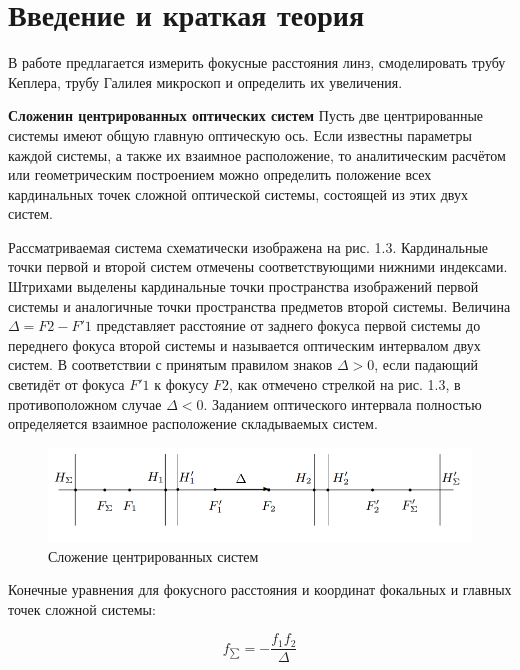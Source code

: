 \section{Введение и краткая теория}

    В работе предлагается измерить фокусные расстояния линз, смоделировать трубу Кеплера, трубу Галилея
    микроскоп и определить их увеличения.
    \newline

    \textbf{Сложенин центрированных оптических систем}
    Пусть две центрированные системы имеют общую главную оптическую ось. Если известны параметры каждой системы, а также их взаимное расположение, то аналитическим расчётом или геометрическим
    построением можно определить положение всех кардинальных точек
    сложной оптической системы, состоящей из этих двух систем.

    Рассматриваемая система схематически изображена на рис. 1.3.
    Кардинальные точки первой и второй систем отмечены соответствующими нижними индексами. Штрихами выделены кардинальные точки
    пространства изображений первой системы и аналогичные точки пространства предметов второй системы. 
    Величина $\Delta = F2 - F'1$ представляет расстояние от заднего фокуса первой системы до переднего фокуса
    второй системы и называется оптическим интервалом двух систем. 
    В соответствии с принятым правилом знаков $\Delta > 0$, если падающий светидёт от фокуса $F'1$ к фокусу $F2$, как отмечено стрелкой на рис. 1.3, в
    противоположном случае $\Delta < 0$. Заданием оптического интервала полностью определяется взаимное расположение складываемых систем.

    \begin{figure}[h!]
        \centering
        \includegraphics[width=0.8\linewidth]{pics/system_of_lens.png}
        \caption{Сложение центрированных систем}
        \label{}
    \end{figure}


    Конечные уравнения для фокусного расстояния и координат фокальных и главных точек сложной системы:


    \begin{equation}\label{1}
        f_{\sum} = - \frac{f_1 f_2}{\Delta}
    \end{equation}


